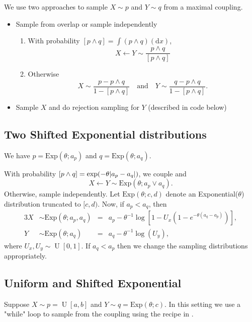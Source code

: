 \documentclass[11pt,a4paper]{article}
\newcommand{\Exp}[1]{\mathrm{Exp}(#1)}
\DeclarePairedDelimiter\abs{\lvert}{\rvert}%
\DeclareMathOperator*{\Unif}{\mathrm{U}}
\begin{document}
We use two approaches to sample $ X \sim p $ and $ Y \sim q $ from a maximal coupling.
\begin{itemize}
    \item Sample from overlap or sample independently
    \begin{enumerate}
        \item With probability $ [p \wedge q] = \int (p \wedge q)(\mathrm{d} x) $,
        \[
            X \leftarrow Y \sim \frac{p \wedge q}{[p \wedge q]}
        \]
        \item Otherwise
        \[
            X \sim \frac{p - p \wedge q}{1 - [p \wedge q]}
            \quad \text{and} \quad
            Y \sim \frac{q - p \wedge q}{1 - [p \wedge q]}.
        \]
    \end{enumerate}
    \item Sample $ X $ and do rejection sampling for $ Y $ (described in code below)
\end{itemize}

\subsection{Two Shifted Exponential distributions}

We have $ p = \Exp{\theta; a_p} $ and $ q = \Exp{\theta; a_q} $.

With probability $ [p \wedge q] = \exp(-\theta \abs{a_p - a_q}) $, we couple and
\[
X \leftarrow Y \sim \Exp{\theta; a_p \vee a_q}.
\]
Otherwise, sample independently. Let $ \Exp{\theta; c, d} $ denote an Exponential($ \theta $) distribution truncated to $ [c, d) $. Now, if $ a_p < a_q $, then
\begin{alignat*}{3}
    X &\sim \Exp{\theta; a_p, a_q}
        &=& a_p - \theta^{-1} \log[1 - U_x (1 - e^{-\theta (a_q - a_p)})], \\
    Y &\sim \Exp{\theta; a_q}
        &=& a_q - \theta^{-1} \log(U_y),
\end{alignat*}
where $ U_x, U_y \sim \Unif[0, 1] $. If $ a_q < a_p $ then we change the sampling distributions appropriately.

\subsection{Uniform and Shifted Exponential}

Suppose $ X \sim p = \Unif[a, b] $ and $ Y \sim q = \Exp{\theta; c} $. In this setting we use a "while" loop to sample from the coupling using the recipe in \citet{jacob20}.
\end{document}
